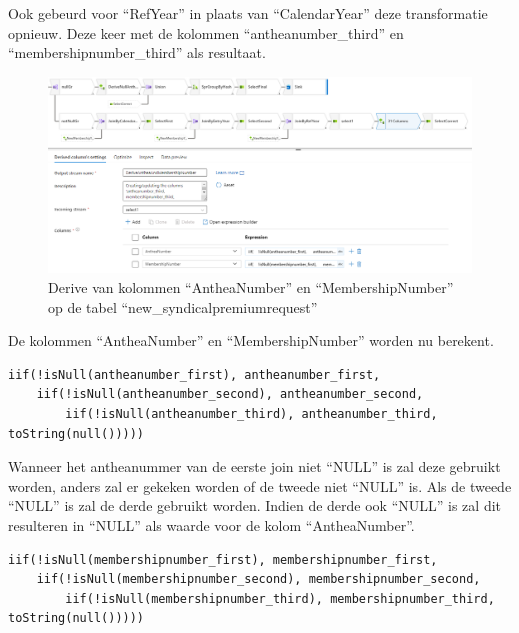 Ook gebeurd voor ``RefYear'' in plaats van ``CalendarYear'' deze transformatie opnieuw. Deze keer met de kolommen ``antheanumber\_third'' en ``membershipnumber\_third'' als resultaat.

\begin{figure}[H]
    \centering
    \includegraphics[width=1\textwidth]{./graphics/adf/member_7.png}
    \caption{Derive van kolommen ``AntheaNumber'' en ``MembershipNumber'' op de tabel ``new\_syndicalpremiumrequest''}
\end{figure}

De kolommen ``AntheaNumber'' en ``MembershipNumber'' worden nu berekent.

\begin{lstlisting}[language={}, caption={Expressie voor het bepalen van de kolom ``AntheaNumber" in ``new\_syndicalpremiumrequest''.}, style=myStyle]
iif(!isNull(antheanumber_first), antheanumber_first,      
    iif(!isNull(antheanumber_second), antheanumber_second,
        iif(!isNull(antheanumber_third), antheanumber_third, toString(null()))))
\end{lstlisting}

Wanneer het antheanummer van de eerste join niet ``NULL'' is zal deze gebruikt worden, anders zal er gekeken worden of de tweede niet ``NULL'' is. Als de tweede ``NULL'' is zal de derde gebruikt worden. Indien de derde ook ``NULL'' is zal dit resulteren in ``NULL'' als waarde voor de kolom ``AntheaNumber''.

\begin{lstlisting}[language={}, caption={Expressie voor het bepalen van de kolom ``MembershipNumber" in ``new\_syndicalpremiumrequest''.}, style=myStyle]
iif(!isNull(membershipnumber_first), membershipnumber_first, 
    iif(!isNull(membershipnumber_second), membershipnumber_second,         
        iif(!isNull(membershipnumber_third), membershipnumber_third, toString(null()))))
\end{lstlisting}

